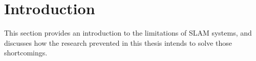 \section{Introduction}

This section provides an introduction to the limitations of SLAM systems, and discusses how the research prevented in this thesis intends to solve those shortcomings.







